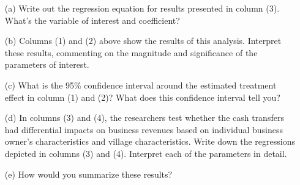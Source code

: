 \begin{homeworkProblem}
    \begin{itemize}
        \item[(a)] Write out the regression equation for results presented in 
        column (3). What’s the variable of interest and coefficient?
        \item[(b)] Columns (1) and (2) above show the results of this analysis. 
        Interpret these results, commenting on the magnitude and significance 
        of the parameters of interest.
        \item[(c)] What is the 95\% confidence interval around the estimated 
        treatment effect in column (1) and (2)? What does this confidence 
        interval tell you?
        \item[(d)] In columns (3) and (4), the researchers test whether the 
        cash transfers had differential impacts on business revenues based on 
        individual business owner’s characteristics and village characteristics. 
        Write down the regressions depicted in columns (3) and (4). Interpret 
        each of the parameters in detail.
        \item[(e)] How would you summarize these results?
    \end{itemize}

\end{homeworkProblem}